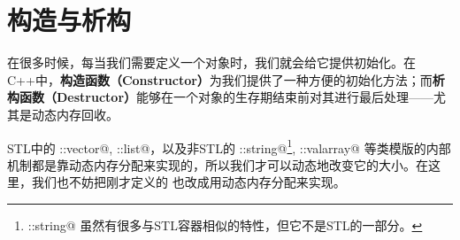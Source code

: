 \section{构造与析构}
在很多时候，每当我们需要定义一个对象时，我们就会给它提供初始化。在C++中，\textbf{构造函数（Constructor）}为我们提供了一种方便的初始化方法；而\textbf{析构函数（Destructor）}能够在一个对象的生存期结束前对其进行最后处理——尤其是动态内存回收。\par
STL中的 \lstinline@std::vector@, \lstinline@std::list@，以及非STL的 \lstinline@std::string@\footnote{\lstinline@std::string@ 虽然有很多与STL容器相似的特性，但它不是STL的一部分。}, \lstinline@std::valarray@ 等类模版的内部机制都是靠动态内存分配来实现的，所以我们才可以动态地改变它的大小。在这里，我们也不妨把刚才定义的 \lstinline@valarri@ 也改成用动态内存分配来实现。\par
